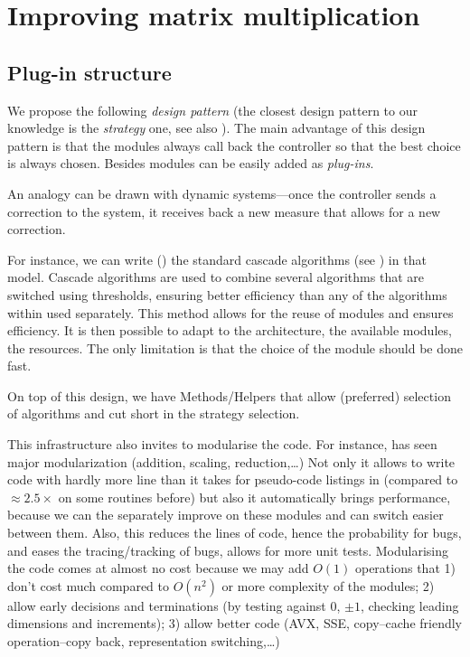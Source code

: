 \section{Improving \linbox matrix multiplication}\label{sec:matmul}
%
%
\subsection{Plug-in structure}
%
We propose the following \emph{design pattern} (the closest design pattern to our
knowledge is the \emph{strategy} one, see also \cite[Fig 2.]{Cung:2006:TC}).
The main advantage of this design pattern is that the modules always call back
the controller so that the best choice is always chosen.  Besides modules can
be easily added as \emph{plug-ins}.
%

%
An analogy can be drawn with dynamic
systems---once the controller sends a correction to the system, it receives
back a new measure that allows for a new correction.
%
%
%
\par
%
For instance, we can write () the standard cascade algorithms
(see \cite{Dumas:2008:Flas}) in that model. Cascade algorithms are used to combine
several algorithms that are switched using thresholds, ensuring better
efficiency than any of the algorithms within used separately.
%
%
%
This method allows for the reuse of modules and ensures efficiency.
It is then possible to adapt to the architecture, the available modules,
the resources. The only limitation is that the choice of the module
should be done fast.
%

%
On top of this design, we have Methods/Helpers that allow (preferred) selection
of algorithms and cut short in the strategy selection.
%
%
%
\par
%
This infrastructure also invites to modularise the code. For instance,
\fflasffpack has seen major  modularization (addition, scaling,
reduction,\ldots) Not only it allows to write code with hardly more line than
it takes for pseudo-code listings in \cite{Boyer:2009:sched} (compared to
$\approx 2.5\times$ on some routines before) but also it automatically brings
performance, because we can the separately improve on these modules and can
switch easier between them. Also, this reduces the lines of code, hence the
probability for bugs, and eases the tracing/tracking of bugs, allows for more
unit tests. Modularising the code comes at almost no cost because we may add
$O(1)$  operations that 1) don't cost much compared to $O(n^2)$ or more
complexity of the modules; 2) allow early decisions and terminations (\eg by
testing against $0$, $\pm 1$, checking leading dimensions and increments); 3)
allow better code (AVX, SSE, copy--cache friendly operation--copy back,
representation switching,\ldots)
%
